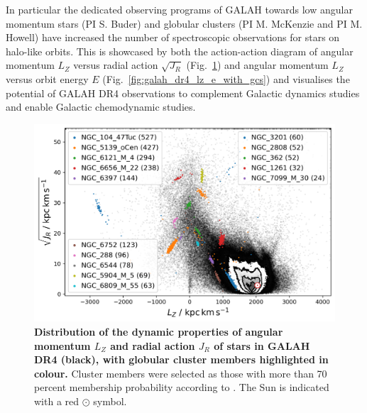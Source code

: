 \documentclass[
  journal=pasa,
  manuscript=research-paper, %
  year=2024,
  volume=37
]{cup-journal}
\begin{document}
In particular the dedicated observing programs of GALAH towards low angular momentum stars (PI S. Buder) and globular clusters (PI M. McKenzie and PI M. Howell) have increased the number of spectroscopic observations for stars on halo-like orbits. This is showcased by both the action-action diagram of angular momentum $L_Z$ versus radial action $\sqrt{J_R}$ (Fig.~\ref{fig:galah_dr4_lz_jr_with_gcs}) and angular momentum $L_Z$ versus orbit energy $E$ (Fig.~\ref{fig:galah_dr4_lz_e_with_gcs}) and visualises the potential of GALAH DR4 observations to complement Galactic dynamics studies and enable Galactic chemodynamic studies.

\begin{figure}
\includegraphics[width=\columnwidth]{figures/galah_dr4_lz_jr_with_gcs.png}
\caption{
\textbf{Distribution of the dynamic properties of angular momentum $L_Z$ and radial action $J_R$ of stars in GALAH DR4 (black), with globular cluster members highlighted in colour.} Cluster members were selected as those with more than 70 percent membership probability according to \citet{Vasiliev2021}. The Sun is indicated with a red $\odot$ symbol.
}
\label{fig:galah_dr4_lz_jr_with_gcs}
\end{figure}
\end{document}
